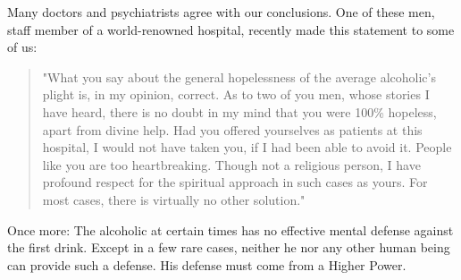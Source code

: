 Many doctors and psychiatrists agree with our conclusions. 
One of these men, staff member of a world-renowned hospital, recently made this statement to some of us: 
\begin{quote}
    "What you say about the general hopelessness of the average alcoholic's plight is, in my opinion, correct.  
    As to two of you men, whose stories I have heard, there is no doubt in my mind that you were 100\% hopeless, apart from divine help.  
    Had you offered yourselves as patients at this hospital, I would not have taken you, if I had been able to avoid it. 
    People like you are too heartbreaking. 
    Though not a religious person, I have profound respect for the spiritual approach in such cases as yours. 
    For most cases, there is virtually no other solution."
\end{quote}

Once more: The alcoholic at certain times has no effective mental defense against the first drink. 
Except in a few rare cases, neither he nor any other human being can provide such a defense. 
His defense must come from a Higher Power.

